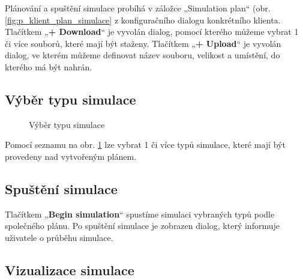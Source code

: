 \documentclass[czech,DP]{thesiskiv}
\begin{document}
Plánování a spuštění simulace probíhá v záložce „Simulation plan“ (obr. \ref{fig:p_klient_plan_simulace} z konfiguračního dialogu konkrétního klienta. Tlačítkem „\textbf{+ Download}“ je vyvolán dialog, pomocí kterého můžeme vybrat 1 či více souborů, které mají být staženy. Tlačítkem „\textbf{+ Upload}“ je vyvolán dialog, ve kterém můžeme definovat název souboru, velikost a umístění, do kterého má být nahrán.

\subsection{Výběr typu simulace}

\begin{figure}[H]
\centering
\caption{Výběr typu simulace}
\label{fig:p_klient_plan_typy_simulace}
\end{figure}

Pomocí seznamu na obr. \ref{fig:p_klient_plan_typy_simulace} lze vybrat 1 či více typů simulace, které mají být provedeny nad vytvořeným plánem. 

\subsection{Spuštění simulace}

Tlačítkem „\textbf{Begin simulation}“ spustíme simulaci vybraných typů podle společného plánu. Po spuštění simulace je zobrazen dialog, který informuje uživatele o průběhu simulace.

\subsection{Vizualizace simulace}
\end{document}
